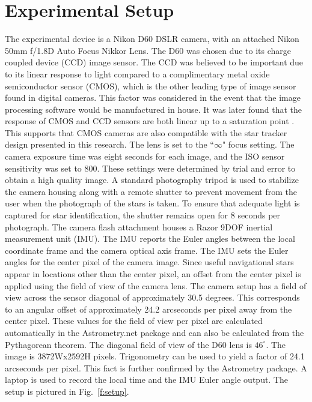 \documentclass[12pt,a4paper]{book}
\begin{document}
\section{Experimental Setup}
The experimental device is a Nikon D60 DSLR camera, with an attached Nikon 50mm f/1.8D Auto Focus Nikkor Lens. The D60 was chosen due to its charge coupled device (CCD) image sensor.  The CCD was believed to be important due to its linear response to light compared to a complimentary metal oxide semiconductor sensor (CMOS), which is the other leading type of image sensor found in digital cameras.  This factor was considered in the event that the image processing software would be manufactured in house.  It was later found that the response of CMOS and CCD sensors are both linear up to a saturation point \cite{b:cmos}.  This supports that CMOS cameras are also compatible with the star tracker design presented in this research.   The lens is set to the ``$\infty$" focus setting. The camera exposure time was eight seconds for each image, and the ISO sensor sensitivity was set to 800.  These settings were determined by trial and error to obtain a high quality image. A standard photography tripod is used to stabilize the camera housing along with a remote shutter to prevent movement from the user when the photograph of the stars is taken.  To ensure that adequate light is captured for star identification, the shutter remains open for 8 seconds per photograph. 
The camera flash attachment houses a Razor 9DOF inertial measurement unit (IMU).  The IMU reports the Euler angles between the local coordinate frame and the camera optical axis frame.  The IMU sets the Euler angles for the center pixel of the camera image.  Since useful navigational stars appear in locations other than the center pixel, an offset from the center pixel is applied using the field of view of the camera lens.  The camera setup has a field of view across the sensor diagonal of approximately 30.5 degrees.  This corresponds to an angular offset of approximately 24.2 arcseconds per pixel away from the center pixel.  These values for the field of view per pixel are calculated automatically in the Astrometry.net package and can also be calculated from the Pythagorean theorem.  The diagonal field of view of the D60 lens is $46^{\circ}$. The image is 3872Wx2592H pixels.  Trigonometry can be used to yield a factor of 24.1 arcseconds per pixel.  This fact is further confirmed by the Astrometry package. A laptop is used to record the local time and the IMU Euler angle output.  The setup is pictured in Fig.~\ref{f:setup}.
\end{document}
